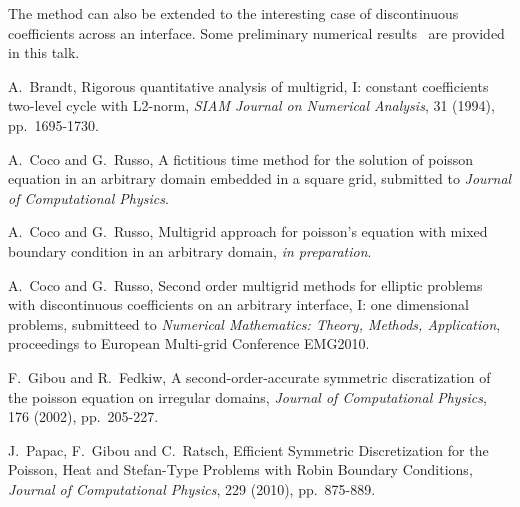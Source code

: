 \documentclass{report}
\begin{document}
The method can also be extended to the interesting case of discontinuous
coefficients across an interface. Some preliminary numerical
results~\cite{CocoRusso:DiscoCoeff1D} are provided in this talk.

\begin{thebibliography}{100}

A.~Brandt, Rigorous quantitative analysis of multigrid, I: constant
coefficients two-level cycle with L2-norm,
{\em SIAM Journal on Numerical Analysis}, 31 (1994), pp.~1695-1730.

A.~Coco and G.~Russo, A fictitious time method for the solution of
poisson equation in an arbitrary domain embedded in a square grid,
submitted to {\em Journal of Computational Physics}.

A.~Coco and G.~Russo, Multigrid approach for poisson's equation with
mixed boundary condition in an arbitrary domain, {\em in preparation}.

A.~Coco and G.~Russo, Second order multigrid methods for elliptic
problems with discontinuous coefficients on an arbitrary interface, I:
one dimensional problems, submitteed to {\em Numerical Mathematics:
Theory, Methods, Application}, proceedings to European Multi-grid
Conference EMG2010.

F.~Gibou and R.~Fedkiw, A second-order-accurate symmetric discratization
of the poisson equation on irregular domains,
{\em Journal of Computational Physics}, 176 (2002), pp.~205-227.

J.~Papac, F.~Gibou and C.~Ratsch, Efficient Symmetric Discretization for
the Poisson, Heat and Stefan-Type Problems with Robin Boundary
Conditions,
{\em Journal of Computational Physics}, 229 (2010), pp.~875-889.

\end{thebibliography}
\end{document}
